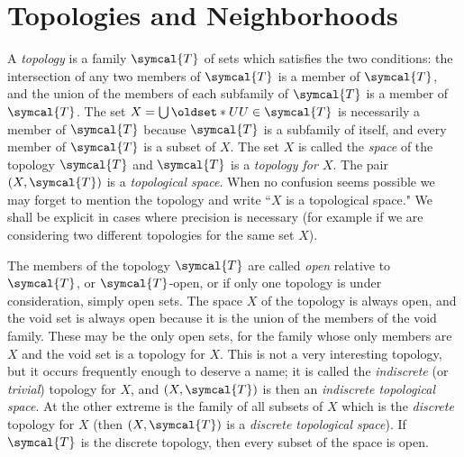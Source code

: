 \section{Topologies and Neighborhoods}

A \emph{topology} is a family \(\symcal{T}\) of sets which satisfies the two conditions: the intersection of any two members of \(\symcal{T}\) is a member of \(\symcal{T}\), and the union of the members of each subfamily of \(\symcal{T}\) is a member of \(\symcal{T}\). The set \(X=\bigcup\set{U}[U\in\symcal{T}]\) is necessarily a member of \(\symcal{T}\) because \(\symcal{T}\) is a subfamily of itself, and every member of \(\symcal{T}\) is a subset of \(X\). The set \(X\) is called the \emph{space} of the topology \(\symcal{T}\) and \(\symcal{T}\) is a \emph{topology for \(X\)}. The pair \(\left(X,\symcal{T}\right)\) is a \emph{topological space}. When no confusion seems possible we may forget to mention the topology and write ``\(X\) is a topological space." We shall be explicit in cases where precision is necessary (for example if we are considering two different topologies for the same set \(X\)).

The members of the topology \(\symcal{T}\) are called \emph{open} relative to \(\symcal{T}\), or \(\symcal{T}\)-open, or if only one topology is under consideration, simply open sets. The space \(X\) of the topology is always open, and the void set is always open because it is the union of the members of the void family. These may be the only open sets, for the family whose only members are \(X\) and the void set is a topology for \(X\). This is not a very interesting topology, but it occurs frequently enough to deserve a name; it is called the \emph{indiscrete} (or \emph{trivial}) topology for \(X\), and \(\left(X,\symcal{T}\right)\) is then an \emph{indiscrete topological space}. At the other extreme is the family of all subsets of \(X\) which is the \emph{discrete} topology for \(X\) (then \(\left(X,\symcal{T}\right)\) is a \emph{discrete topological space}). If \(\symcal{T}\) is the discrete topology, then every subset of the space is open.

